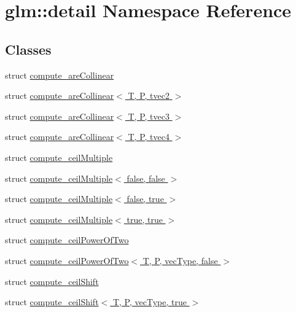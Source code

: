 \hypertarget{namespaceglm_1_1detail}{}\section{glm\+:\+:detail Namespace Reference}
\label{namespaceglm_1_1detail}
\subsection*{Classes}
\begin{DoxyCompactItemize}
\item 
struct \hyperlink{structglm_1_1detail_1_1compute__are_collinear}{compute\+\_\+are\+Collinear}
\item 
struct \hyperlink{structglm_1_1detail_1_1compute__are_collinear_3_01_t_00_01_p_00_01tvec2_01_4}{compute\+\_\+are\+Collinear$<$ T, P, tvec2 $>$}
\item 
struct \hyperlink{structglm_1_1detail_1_1compute__are_collinear_3_01_t_00_01_p_00_01tvec3_01_4}{compute\+\_\+are\+Collinear$<$ T, P, tvec3 $>$}
\item 
struct \hyperlink{structglm_1_1detail_1_1compute__are_collinear_3_01_t_00_01_p_00_01tvec4_01_4}{compute\+\_\+are\+Collinear$<$ T, P, tvec4 $>$}
\item 
struct \hyperlink{structglm_1_1detail_1_1compute__ceil_multiple}{compute\+\_\+ceil\+Multiple}
\item 
struct \hyperlink{structglm_1_1detail_1_1compute__ceil_multiple_3_01false_00_01false_01_4}{compute\+\_\+ceil\+Multiple$<$ false, false $>$}
\item 
struct \hyperlink{structglm_1_1detail_1_1compute__ceil_multiple_3_01false_00_01true_01_4}{compute\+\_\+ceil\+Multiple$<$ false, true $>$}
\item 
struct \hyperlink{structglm_1_1detail_1_1compute__ceil_multiple_3_01true_00_01true_01_4}{compute\+\_\+ceil\+Multiple$<$ true, true $>$}
\item 
struct \hyperlink{structglm_1_1detail_1_1compute__ceil_power_of_two}{compute\+\_\+ceil\+Power\+Of\+Two}
\item 
struct \hyperlink{structglm_1_1detail_1_1compute__ceil_power_of_two_3_01_t_00_01_p_00_01vec_type_00_01false_01_4}{compute\+\_\+ceil\+Power\+Of\+Two$<$ T, P, vec\+Type, false $>$}
\item 
struct \hyperlink{structglm_1_1detail_1_1compute__ceil_shift}{compute\+\_\+ceil\+Shift}
\item 
struct \hyperlink{structglm_1_1detail_1_1compute__ceil_shift_3_01_t_00_01_p_00_01vec_type_00_01true_01_4}{compute\+\_\+ceil\+Shift$<$ T, P, vec\+Type, true $>$}

\end{DoxyCompactItemize}
